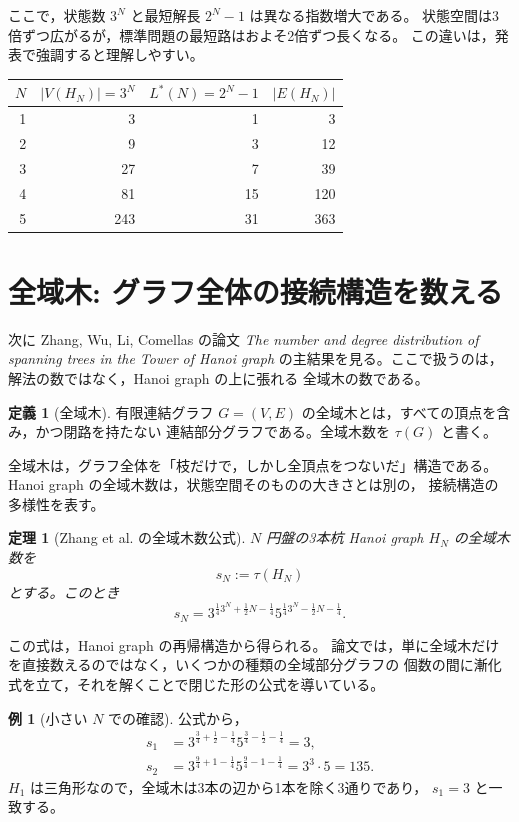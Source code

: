 \documentclass[a4paper,11pt]{ltjsarticle}
\theoremstyle{definition}
\newtheorem{definition}{定義}[section]
\newtheorem{example}{例}[section]
\theoremstyle{plain}
\newtheorem{theorem}{定理}[section]
\theoremstyle{remark}
\newcommand{\HN}{H_N}
\begin{document}
ここで，状態数 \(3^N\) と最短解長 \(2^N-1\) は異なる指数増大である。
状態空間は3倍ずつ広がるが，標準問題の最短路はおよそ2倍ずつ長くなる。
この違いは，発表で強調すると理解しやすい。

\begin{center}
\begin{tabular}{rrrr}
\toprule
\(N\) & \(|V(\HN)|=3^N\) & \(L^*(N)=2^N-1\) & \(|E(\HN)|\) \\
\midrule
1 & 3 & 1 & 3 \\
2 & 9 & 3 & 12 \\
3 & 27 & 7 & 39 \\
4 & 81 & 15 & 120 \\
5 & 243 & 31 & 363 \\
\bottomrule
\end{tabular}
\end{center}

\section{全域木: グラフ全体の接続構造を数える}

次に Zhang, Wu, Li, Comellas の論文
\textit{The number and degree distribution of spanning trees in the Tower of Hanoi graph}
の主結果を見る。ここで扱うのは，解法の数ではなく，Hanoi graph の上に張れる
全域木の数である。

\begin{definition}[全域木]
有限連結グラフ \(G=(V,E)\) の全域木とは，すべての頂点を含み，かつ閉路を持たない
連結部分グラフである。全域木数を \(\tau(G)\) と書く。
\end{definition}

全域木は，グラフ全体を「枝だけで，しかし全頂点をつないだ」構造である。
Hanoi graph の全域木数は，状態空間そのものの大きさとは別の，
接続構造の多様性を表す。

\begin{theorem}[Zhang et al. の全域木数公式]
\(N\) 円盤の3本杭 Hanoi graph \(\HN\) の全域木数を
\[
  s_N := \tau(\HN)
\]
とする。このとき
\[
  s_N
  =
  3^{\frac{1}{4}3^N+\frac{1}{2}N-\frac{1}{4}}
  5^{\frac{1}{4}3^N-\frac{1}{2}N-\frac{1}{4}}.
\]
\end{theorem}

この式は，Hanoi graph の再帰構造から得られる。
論文では，単に全域木だけを直接数えるのではなく，いくつかの種類の全域部分グラフの
個数の間に漸化式を立て，それを解くことで閉じた形の公式を導いている。

\begin{example}[小さい \(N\) での確認]
公式から，
\[
\begin{aligned}
s_1
&=
3^{\frac{3}{4}+\frac{1}{2}-\frac{1}{4}}
5^{\frac{3}{4}-\frac{1}{2}-\frac{1}{4}}
=3,\\
s_2
&=
3^{\frac{9}{4}+1-\frac{1}{4}}
5^{\frac{9}{4}-1-\frac{1}{4}}
=3^3\cdot 5=135.
\end{aligned}
\]
\(H_1\) は三角形なので，全域木は3本の辺から1本を除く3通りであり，
\(s_1=3\) と一致する。
\end{example}
\end{document}
